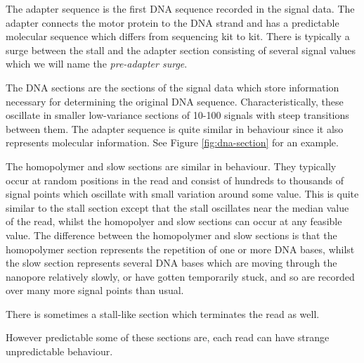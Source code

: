The adapter sequence is the first DNA sequence recorded in the signal data. The adapter connects the motor protein to the DNA strand and has a predictable molecular sequence which differs from sequencing kit to kit. There is typically a surge between the stall and the adapter section consisting of several signal values which we will name the \textit{pre-adapter surge}.



The DNA sections are the sections of the signal data which store information necessary for determining the original DNA sequence. Characteristically, these oscillate in smaller low-variance sections of 10-100 signals with steep transitions between them. The adapter sequence is quite similar in behaviour since it also represents molecular information. See Figure \ref{fig:dna-section} for an example.



The homopolymer and slow sections are similar in behaviour. They typically occur at random positions in the read and consist of hundreds to thousands of signal points which oscillate with small variation around some value. This is quite similar to the stall section except that the stall oscillates near the median value of the read, whilst the homopolyer and slow sections can occur at any feasible value. The difference between the homopolymer and slow sections is that the homopolymer section represents the repetition of one or more DNA bases, whilst the slow section represents several DNA bases which are moving through the nanopore relatively slowly, or have gotten temporarily stuck, and so are recorded over many more signal points than usual.





There is sometimes a stall-like section which terminates the read as well.




However predictable some of these sections are, each read can have strange unpredictable behaviour.


